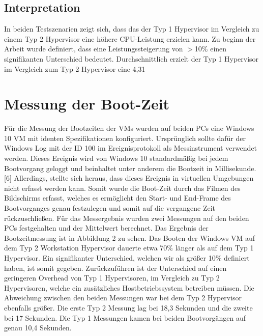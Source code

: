 \documentclass[conference]{IEEEtran}
\begin{document}
\subsection{Interpretation}
In beiden Testszenarien zeigt sich, dass das der Typ 1 Hypervisor im Vergleich zu einem Typ 2 Hypervisor eine höhere CPU-Leistung erzielen kann. Zu beginn der Arbeit wurde definiert, dass eine Leistungssteigerung von $>$10\% einen signifikanten Unterschied bedeutet. Durchschnittlich erzielt der Typ 1 Hypervisor im Vergleich zum Typ 2 Hypervisor eine 4,31%

\section{Messung der Boot-Zeit}
\label{Messung der CPU Performance}
Für die Messung der Bootzeiten der VMs wurden auf beiden PCs eine Windows 10 VM mit identen Spezifikationen konfiguriert. Ursprünglich sollte dafür der Windows Log mit der ID 100 im Ereignisprotokoll als Messinstrument verwendet werden. Dieses Ereignis wird von Windows 10 standardmäßig bei jedem Bootvorgang geloggt und beinhaltet unter anderem die Bootzeit in Millisekunde. [6] Allerdings, stellte sich heraus, dass dieses Ereignis in virtuellen Umgebungen nicht erfasst werden kann. Somit wurde die Boot-Zeit durch das Filmen des Bildschirms erfasst, welches es ermöglicht den Start- und End-Frame des Bootvorganges genau festzulegen und somit auf die vergangene Zeit rückzuschließen. Für das Messergebnis wurden zwei Messungen auf den beiden PCs festgehalten und der Mittelwert berechnet.
Das Ergebnis der Bootzeitmessung ist in Abbildung 2 zu sehen. Das Booten der Windows VM auf dem Typ 2 Workstation Hypervisor dauerte etwa 70\% länger als auf dem Typ 1 Hypervisor. Ein signifikanter Unterschied, welchen wir als größer 10\% definiert haben, ist somit gegeben. Zurückzuführen ist der Unterschied auf einen geringeren Overhead von Typ 1 Hypervisoren, im Vergleich zu Typ 2 Hypervisoren, welche ein zusätzliches Hostbetriebssystem betreiben müssen. Die Abweichung zwischen den beiden Messungen war bei dem Typ 2 Hypervisor ebenfalls größer. Die erste Typ 2 Messung lag bei 18,3 Sekunden und die zweite bei 17 Sekunden. Die Typ 1 Messungen kamen bei beiden Bootvorgängen auf genau 10,4 Sekunden.
\end{document}
